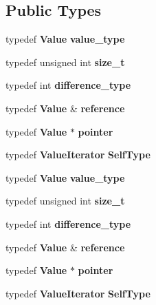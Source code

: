 \subsection*{Public Types}
\begin{DoxyCompactItemize}
\item 
typedef {\bf Value} {\bfseries value\+\_\+type}\label{class_json_1_1_value_iterator_a2c5ba7be611f05546530c8a88b2d2e37}

\item 
typedef unsigned int {\bfseries size\+\_\+t}\label{class_json_1_1_value_iterator_a308b8932ffc83eaa9d12dadd5c11a7dd}

\item 
typedef int {\bfseries difference\+\_\+type}\label{class_json_1_1_value_iterator_a2be1a9aa60bbfc8812e9dd1a7f1a8786}

\item 
typedef {\bf Value} \& {\bfseries reference}\label{class_json_1_1_value_iterator_ae87929b4567aa00372cf602c43b57160}

\item 
typedef {\bf Value} $\ast$ {\bfseries pointer}\label{class_json_1_1_value_iterator_acec45feb1ef1f3bf81240157d06d5432}

\item 
typedef {\bf Value\+Iterator} {\bfseries Self\+Type}\label{class_json_1_1_value_iterator_a23357670fdad61792670d86f62db7e16}

\item 
typedef {\bf Value} {\bfseries value\+\_\+type}\label{class_json_1_1_value_iterator_a2c5ba7be611f05546530c8a88b2d2e37}

\item 
typedef unsigned int {\bfseries size\+\_\+t}\label{class_json_1_1_value_iterator_a308b8932ffc83eaa9d12dadd5c11a7dd}

\item 
typedef int {\bfseries difference\+\_\+type}\label{class_json_1_1_value_iterator_a2be1a9aa60bbfc8812e9dd1a7f1a8786}

\item 
typedef {\bf Value} \& {\bfseries reference}\label{class_json_1_1_value_iterator_ae87929b4567aa00372cf602c43b57160}

\item 
typedef {\bf Value} $\ast$ {\bfseries pointer}\label{class_json_1_1_value_iterator_acec45feb1ef1f3bf81240157d06d5432}

\item 
typedef {\bf Value\+Iterator} {\bfseries Self\+Type}\label{class_json_1_1_value_iterator_a23357670fdad61792670d86f62db7e16}


\end{DoxyCompactItemize}
